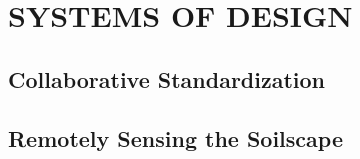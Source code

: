 \section{SYSTEMS OF DESIGN}

\subsection{Collaborative Standardization}


\subsection{Remotely Sensing the Soilscape}
